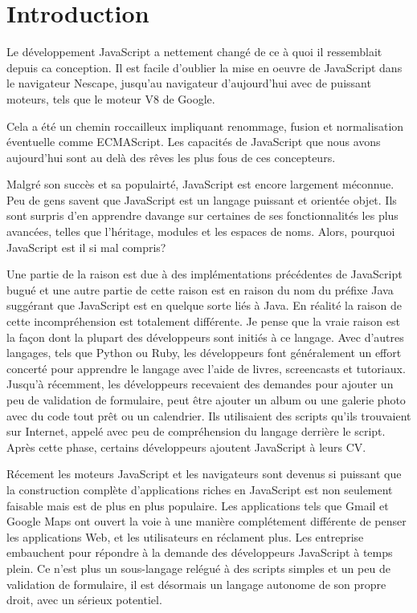 \chapter{Introduction}
\label{ch:introduction}

Le développement JavaScript a nettement changé de ce à quoi il ressemblait depuis ca conception. Il est facile d’oublier la mise en oeuvre de JavaScript dans le navigateur Nescape, jusqu’au navigateur d’aujourd’hui avec de puissant moteurs, tels que le moteur V8 de Google.

Cela a été un chemin roccailleux impliquant renommage, fusion et normalisation éventuelle comme ECMAScript. Les capacités de JavaScript que nous avons aujourd’hui sont au delà des rêves les plus fous de ces concepteurs.

Malgré son succès et sa populairté, JavaScript est encore largement méconnue. Peu de gens savent que JavaScript est un langage puissant et orientée objet. Ils sont surpris d’en apprendre davange sur certaines de ses fonctionnalités les plus avancées, telles que l’héritage, modules et les espaces de noms. Alors, pourquoi JavaScript est il si mal compris?

Une partie de la raison est due à des implémentations précédentes de JavaScript bugué et une autre partie de cette raison est en raison du nom du préfixe Java suggérant que JavaScript est en quelque sorte liés à Java. En réalité la raison de cette incompréhension est totalement différente. Je pense que la vraie raison est la façon dont la plupart des développeurs sont initiés à ce langage. Avec d’autres langages, tels que Python ou Ruby, les développeurs font généralement un effort concerté pour apprendre le langage avec l’aide de livres, screencasts et tutoriaux. Jusqu’à récemment, les développeurs recevaient des demandes pour ajouter un peu de validation de formulaire, peut être ajouter un album ou une galerie photo avec du code tout prêt ou un calendrier.  Ils utilisaient des scripts qu’ils trouvaient sur Internet, appelé avec peu de compréhension du langage derrière le script. Après cette phase, certains développeurs ajoutent JavaScript à leurs CV.

Récement les moteurs JavaScript et les navigateurs sont devenus si puissant que la construction complète d’applications riches en JavaScript est non seulement faisable mais est de plus en plus populaire. Les applications tels que Gmail et Google Maps ont ouvert la voie à une manière complétement différente de penser les applications Web, et les utilisateurs en réclament plus. Les entreprise embauchent pour répondre à la demande des développeurs JavaScript à temps plein. Ce n’est plus un sous-langage relégué à des scripts simples et un peu de validation de formulaire, il est désormais un langage autonome de son propre droit, avec un sérieux potentiel.

